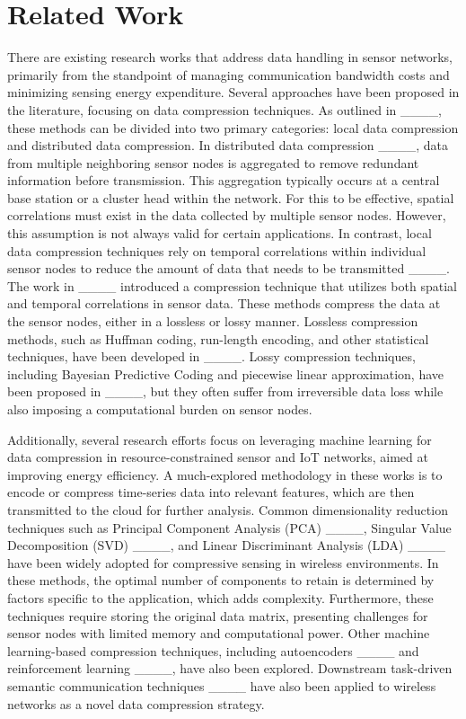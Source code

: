 \section{Related Work}
\label{secii}

There are existing research works that address data handling in sensor networks, primarily from the standpoint of managing communication bandwidth costs and minimizing sensing energy expenditure. Several approaches have been proposed in the literature, focusing on data compression techniques. As outlined in ____, these methods can be divided into two primary categories: local data compression and distributed data compression. In distributed data compression ____, data from multiple neighboring sensor nodes is aggregated to remove redundant information before transmission. This aggregation typically occurs at a central base station or a cluster head within the network. For this to be effective, spatial correlations must exist in the data collected by multiple sensor nodes. However, this assumption is not always valid for certain applications. In contrast, local data compression techniques rely on temporal correlations within individual sensor nodes to reduce the amount of data that needs to be transmitted ____. The work in ____ introduced a compression technique that utilizes both spatial and temporal correlations in sensor data. These methods compress the data at the sensor nodes, either in a lossless or lossy manner. Lossless compression methods, such as Huffman coding, run-length encoding, and other statistical techniques, have been developed in ____. Lossy compression techniques, including Bayesian Predictive Coding and piecewise linear approximation, have been proposed in ____, but they often suffer from irreversible data loss while also imposing a computational burden on sensor nodes.

Additionally, several research efforts focus on leveraging machine learning for data compression in resource-constrained sensor and IoT networks, aimed at improving energy efficiency. A much-explored methodology in these works is to encode or compress time-series data into relevant features, which are then transmitted to the cloud for further analysis. Common dimensionality reduction techniques such as Principal Component Analysis (PCA) ____, Singular Value Decomposition (SVD) ____, and Linear Discriminant Analysis (LDA) ____ have been widely adopted for compressive sensing in wireless environments. In these methods, the optimal number of components to retain is determined by factors specific to the application, which adds complexity. Furthermore, these techniques require storing the original data matrix, presenting challenges for sensor nodes with limited memory and computational power. Other machine learning-based compression techniques, including autoencoders ____ and reinforcement learning ____, have also been explored. Downstream task-driven semantic communication techniques ____ have also been applied to wireless networks as a novel data compression strategy. 


